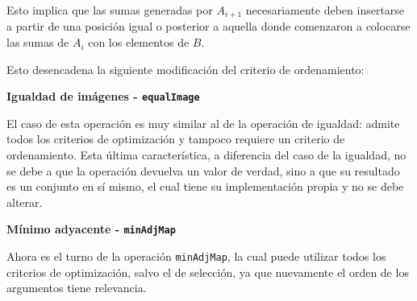 Esto implica que las sumas generadas por $A_{i+1}$ necesariamente deben insertarse a partir de una posición igual o posterior a aquella donde comenzaron a colocarse las sumas de $A_i$ con los elementos de $B$.

Esto desencadena la siguiente modificación del criterio de ordenamiento: 
\begin{center}
\end{center}

\textbf{Igualdad de imágenes - \texttt{equalImage}}

El caso de esta operación es muy similar al de la operación de igualdad: admite todos los criterios de optimización y tampoco requiere un criterio de ordenamiento. Esta última característica, a diferencia del caso de la igualdad, no se debe a que la operación devuelva un valor de verdad, sino a que su resultado es un conjunto en sí mismo, el cual tiene su implementación propia y no se debe alterar.


\textbf{Mínimo adyacente - \texttt{minAdjMap}}

Ahora es el turno de la operación \texttt{minAdjMap}, la cual puede utilizar todos los criterios de optimización, salvo el de selección, ya que nuevamente el orden de los argumentos tiene relevancia. 

